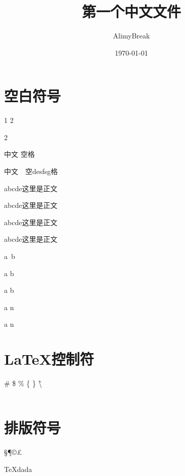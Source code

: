 \documentclass{article}  %
\title{第一个中文文件}
\author{\kaishu AlimyBreak}
\date{\today}
\begin{document}
\maketitle
\tableofcontents

\section{空白符号}
% 
1 2

2

中文   空格

中文\ \ 空desfsg格

abcde\quad 这里\quad 是正文

abcde\qquad 这里\qquad 是正文

abcde\thinspace 这里\thinspace 是正文

abcde\enspace 这里\enspace 是正文

a~b

a \kern 1pc b 

a \kern -1pc b 


a \hspace{35pt} n

a \hfill n

\section{\LaTeX 控制符}
\# \$ \% \{ \} \~ \textbackslash \\\\

\section{排版符号}
\S \P \dag \ddag \copyright \pounds


\TeX{dada}
\end{document}
